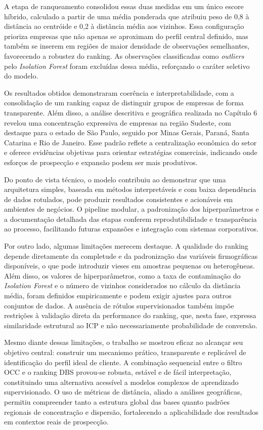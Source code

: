 A etapa de ranqueamento consolidou essas duas medidas em um único escore híbrido, calculado a partir de uma média ponderada que atribuiu peso de 0,8 à distância ao centróide e 0,2 à distância média aos vizinhos. Essa configuração prioriza empresas que não apenas se aproximam do perfil central definido, mas também se inserem em regiões de maior densidade de observações semelhantes, favorecendo a robustez do ranking. As observações classificadas como \textit{outliers} pelo \textit{Isolation Forest} foram excluídas dessa média, reforçando o caráter seletivo do modelo.

Os resultados obtidos demonstraram coerência e interpretabilidade, com a consolidação de um ranking capaz de distinguir grupos de empresas de forma transparente. Além disso, a análise descritiva e geográfica realizada no Capítulo 6 revelou uma concentração expressiva de empresas na região Sudeste, com destaque para o estado de São Paulo, seguido por Minas Gerais, Paraná, Santa Catarina e Rio de Janeiro. Esse padrão reflete a centralização econômica do setor e oferece evidências objetivas para orientar estratégias comerciais, indicando onde esforços de prospecção e expansão podem ser mais produtivos.

Do ponto de vista técnico, o modelo contribuiu ao demonstrar que uma arquitetura simples, baseada em métodos interpretáveis e com baixa dependência de dados rotulados, pode produzir resultados consistentes e acionáveis em ambientes de negócios. O pipeline modular, a padronização dos hiperparâmetros e a documentação detalhada das etapas conferem reprodutibilidade e transparência ao processo, facilitando futuras expansões e integração com sistemas corporativos.

Por outro lado, algumas limitações merecem destaque. A qualidade do ranking depende diretamente da completude e da padronização das variáveis firmográficas disponíveis, o que pode introduzir vieses em amostras pequenas ou heterogêneas. Além disso, os valores de hiperparâmetros, como a taxa de contaminação do \textit{Isolation Forest} e o número de vizinhos considerados no cálculo da distância média, foram definidos empiricamente e podem exigir ajustes para outros conjuntos de dados. A ausência de rótulos supervisionados também impõe restrições à validação direta da performance do ranking, que, nesta fase, expressa similaridade estrutural ao ICP e não necessariamente probabilidade de conversão.

Mesmo diante dessas limitações, o trabalho se mostrou eficaz ao alcançar seu objetivo central: construir um mecanismo prático, transparente e replicável de identificação do perfil ideal de cliente. A combinação sequencial entre o filtro OCC e o ranking DBS provou-se robusta, estável e de fácil interpretação, constituindo uma alternativa acessível a modelos complexos de aprendizado supervisionado. O uso de métricas de distância, aliado a análises geográficas, permitiu compreender tanto a estrutura global das bases quanto padrões regionais de concentração e dispersão, fortalecendo a aplicabilidade dos resultados em contextos reais de prospecção.

